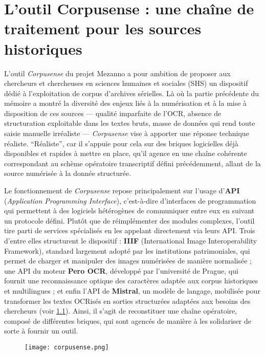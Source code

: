 \chapter{L'outil Corpusense : une chaîne de traitement pour les sources historiques}

L’outil \emph{Corpusense} du projet Mezanno a pour ambition de proposer aux chercheurs et chercheuses en sciences humaines et sociales (SHS) un dispositif dédié à l’exploitation de corpus d’archives sérielles. Là où la partie précédente du mémoire a montré la diversité des enjeux liés à la numérisation et à la mise à disposition de ces sources — qualité imparfaite de l’OCR, absence de structuration exploitable dans les textes bruts, masse de données qui rend toute saisie manuelle irréaliste — \emph{Corpusense} vise à apporter une réponse technique réaliste. \enquote{Réaliste}, car il s’appuie pour cela sur des briques logicielles déjà disponibles et rapides à mettre en place, qu’il agence en une chaîne cohérente correspondant au schème opératoire transcriptif défini précédemment, allant de la source numérisée à la donnée structurée.

Le fonctionnement de \emph{Corpusense} repose principalement sur l’usage d’\textbf{API} (\emph{Application Programming Interface}), c’est-à-dire d’interfaces de programmation qui permettent à des logiciels hétérogènes de communiquer entre eux en suivant un protocole défini. Plutôt que de réimplémenter des modules complexes, l’outil tire parti de services spécialisés en les appelant directement via leurs API. Trois d’entre elles structurent le dispositif : \textbf{IIIF} (International Image Interoperability Framework), standard largement adopté par les institutions patrimoniales, qui permet de charger et manipuler des images numérisées de manière normalisée ; une API du moteur \textbf{Pero OCR}, développé par l’université de Prague, qui fournit une reconnaissance optique des caractères adaptée aux corpus historiques et multilingues ; et enfin l’API de \textbf{Mistral}, un modèle de langage, mobilisée pour transformer les textes OCRisés en sorties structurées adaptées aux besoins des chercheurs (voir \ref{fig:corpusense}). Ainsi, il s'agit de reconstituer une chaîne opératoire, composé de différentes briques, qui sont agencés de manière à les solidariser de sorte à fournir un outil. 

\begin{figure}[htbp]
\centering
\texttt{[image: corpusense.png]}
\caption{}
\label{fig:corpusense}
\end{figure}

